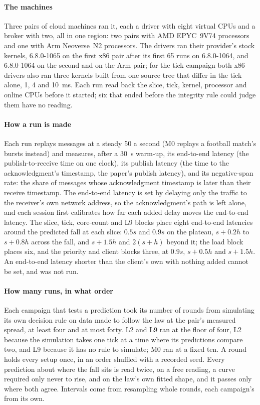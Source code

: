 \documentclass[10pt,journal,onecolumn]{IEEEtran}
\begin{document}
\paragraph{The machines} Three pairs of cloud machines ran it, each a driver with eight virtual
CPUs and a broker with two, all in one region: two pairs with AMD EPYC~9V74 processors and one
with Arm Neoverse~N2 processors. The drivers ran their provider's stock kernels, 6.8.0-1065 on the
first x86 pair after its first 65 runs on 6.8.0-1064, and 6.8.0-1064 on the second and on the Arm
pair; for the tick campaign both x86 drivers also ran three kernels built from one source tree
that differ in the tick alone, 1, 4 and 10~ms. Each run read back the slice, tick, kernel,
processor and online CPUs before it started; six that ended before the integrity rule could judge
them have no reading.

\paragraph{How a run is made} Each run replays messages at a steady 50 a second (M0 replays a
football match's bursts instead) and measures,
after a 30~s warm-up, its end-to-end latency (the publish-to-receive time on one clock), its publish latency (the
time to the acknowledgment's timestamp, the paper's publish latency), and its negative-span
rate: the share of messages whose acknowledgment timestamp is later than their receive
timestamp. The end-to-end latency is set by delaying only the traffic to the receiver's own network
address, so the acknowledgment's path is left alone, and each session first calibrates how far
each added delay moves the end-to-end latency. The slice, tick, core-count and L9 blocks place eight
end-to-end latencies around the predicted fall at each slice: $0.5s$ and $0.9s$ on the plateau, $s + 0.2h$
to $s + 0.8h$ across the fall, and $s + 1.5h$ and $2(s + h)$ beyond it; the load block places six,
and the priority and client blocks three, at $0.9s$, $s + 0.5h$ and $s + 1.5h$. An end-to-end
latency shorter than the client's own with nothing added cannot be set, and was not run.

\paragraph{How many runs, in what order} Each campaign that tests a prediction took its number of
rounds from simulating its own decision rule on data made to follow the law at the pair's
measured spread, at least four and at most forty. L2 and L9 ran at the floor of four, L2 because
the simulation takes one tick at a time where its predictions compare two, and L9 because it has
no rule to simulate; M0 ran at a fixed ten. A round holds every setup once, in an order shuffled with a recorded seed. Every
prediction about where the fall sits is read twice, on a free reading, a curve required only
never to rise, and on the law's own fitted shape, and it passes only where both agree. Intervals
come from resampling whole rounds, each campaign's from its own.
\end{document}
